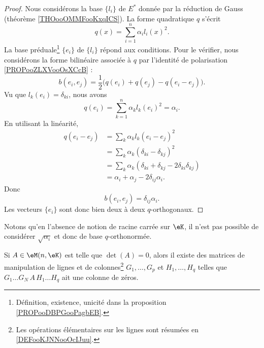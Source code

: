 \begin{proof}
	Nous considérons la base \(  \{ l_i \}    \) de \( E^*\) donnée par la réduction de Gauss (théorème \ref{THOooOMMFooKxqICS}). La forme quadratique \( q\) s'écrit
	\begin{equation}
		q(x)=\sum_{i=1}^n\alpha_il_i(x)^2.
	\end{equation}
	La base préduale\footnote{Définition, existence, unicité dans la proposition \ref{PROPooDBPGooPagbEB}.} \( \{ e_i \}\) de \( \{ l_i \}\) répond aux conditions. Pour le vérifier, nous considérons la forme bilinéaire associée à \( q\) par l'identité de polarisation \ref{PROPooZLXVooOsXCcB} :
	\begin{equation}
		b(e_i,e_j)=\frac{ 1 }{2}\big( q(e_i)+q(e_j)-q(e_i-e_j) \big).
	\end{equation}
	Vu que \( l_k(e_i)=\delta_{ki}\), nous avons
	\begin{equation}
		q(e_i)=\sum_{k=1}^n\alpha_kl_k(e_i)^2=\alpha_i.
	\end{equation}
	En utilisant la linéarité,
	\begin{subequations}
		\begin{align}
			q(e_i-e_j) & =\sum_k\alpha_kl_k(e_i-e_j)^2                                    \\
			           & =\sum_k\alpha_k(\delta_{ki}-\delta_{kj})^2                       \\
			           & =\sum_k\alpha_k(\delta_{ki}+\delta_{kj}-2\delta_{ki}\delta_{kj}) \\
			           & =\alpha_i+\alpha_j-2\delta_{ij}\alpha_i.
		\end{align}
	\end{subequations}
	Donc
	\begin{equation}
		b(e_i,e_j)=\delta_{ij}\alpha_i.
	\end{equation}
	Les vecteurs \( \{ e_i \}\) sont donc bien deux à deux \( q\)-orthogonaux.
\end{proof}

Notons qu'en l'absence de notion de racine carrée sur \( \eK\), il n'est pas possible de considérer \( \sqrt{ \alpha_i }\) et donc de base \( q\)-orthonormée.


\begin{proposition} \label{PROPooPMYCooAAtHsB}
	Si \( A\in \eM(n,\eK)\) est telle que \( \det(A)=0\), alors il existe des matrices de manipulation de lignes et de colonnes\footnote{Les opérations élémentaires sur les lignes sont résumées en \ref{DEFooKJNNooOcIJuu}.} \( G_1,\ldots, G_p\) et \( H_1,\ldots,H_q\) telles que \( G_1\ldots G_N\,A\, H_1\ldots H_q\) ait une colonne de zéros.
\end{proposition}


